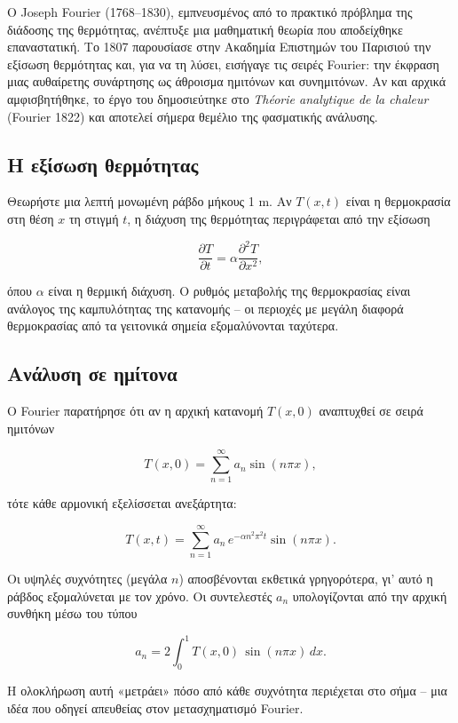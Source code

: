 \documentclass[a4paper, 11pt]{article}
\begin{document}
Ο Joseph Fourier (1768--1830), εμπνευσμένος από το πρακτικό πρόβλημα της
διάδοσης της θερμότητας, ανέπτυξε μια μαθηματική θεωρία που αποδείχθηκε
επαναστατική. Το 1807 παρουσίασε στην Ακαδημία Επιστημών του Παρισιού
την εξίσωση θερμότητας και, για να τη λύσει, εισήγαγε τις σειρές
Fourier: την έκφραση μιας αυθαίρετης συνάρτησης ως άθροισμα ημιτόνων και
συνημιτόνων. Αν και αρχικά αμφισβητήθηκε, το έργο του δημοσιεύτηκε στο
\emph{Théorie analytique de la chaleur} (Fourier 1822) και αποτελεί
σήμερα θεμέλιο της φασματικής ανάλυσης.

\subsection{Η εξίσωση
θερμότητας}\label{ux3b7-ux3b5ux3beux3afux3c3ux3c9ux3c3ux3b7-ux3b8ux3b5ux3c1ux3bcux3ccux3c4ux3b7ux3c4ux3b1ux3c2}

Θεωρήστε μια λεπτή μονωμένη ράβδο μήκους 1 m. Αν \(T(x,t)\) είναι η
θερμοκρασία στη θέση \(x\) τη στιγμή \(t\), η διάχυση της θερμότητας
περιγράφεται από την εξίσωση

\[
\frac{\partial T}{\partial t} = \alpha \frac{\partial^2 T}{\partial x^2},
\]

όπου \(\alpha\) είναι η θερμική διάχυση. Ο ρυθμός μεταβολής της
θερμοκρασίας είναι ανάλογος της καμπυλότητας της κατανομής -- οι
περιοχές με μεγάλη διαφορά θερμοκρασίας από τα γειτονικά σημεία
εξομαλύνονται ταχύτερα.

\subsection{Ανάλυση σε
ημίτονα}\label{ux3b1ux3bdux3acux3bbux3c5ux3c3ux3b7-ux3c3ux3b5-ux3b7ux3bcux3afux3c4ux3bfux3bdux3b1}

Ο Fourier παρατήρησε ότι αν η αρχική κατανομή \(T(x,0)\) αναπτυχθεί σε
σειρά ημιτόνων

\[
T(x,0) = \sum_{n=1}^{\infty} a_n \sin(n\pi x),
\]

τότε κάθε αρμονική εξελίσσεται ανεξάρτητα:

\[
T(x,t) = \sum_{n=1}^{\infty} a_n \, e^{-\alpha n^2 \pi^2 t} \sin(n\pi x).
\]

Οι υψηλές συχνότητες (μεγάλα \(n\)) αποσβένονται εκθετικά γρηγορότερα,
γι' αυτό η ράβδος εξομαλύνεται με τον χρόνο. Οι συντελεστές \(a_n\)
υπολογίζονται από την αρχική συνθήκη μέσω του τύπου

\[
a_n = 2\int_0^1 T(x,0)\,\sin(n\pi x)\,dx.
\]

Η ολοκλήρωση αυτή «μετράει» πόσο από κάθε συχνότητα περιέχεται στο σήμα
-- μια ιδέα που οδηγεί απευθείας στον μετασχηματισμό Fourier.
\end{document}
